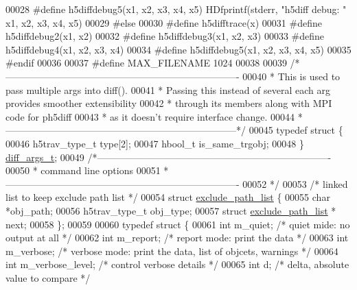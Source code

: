 \begin{DoxyCode}
00028 \textcolor{preprocessor}{#define h5diffdebug5(x1, x2, x3, x4, x5) HDfprintf(stderr, "h5diff debug: " x1, x2, x3, x4, x5)}
00029 \textcolor{preprocessor}{#else}
00030 \textcolor{preprocessor}{#define h5difftrace(x)}
00031 \textcolor{preprocessor}{#define h5diffdebug2(x1, x2)}
00032 \textcolor{preprocessor}{#define h5diffdebug3(x1, x2, x3)}
00033 \textcolor{preprocessor}{#define h5diffdebug4(x1, x2, x3, x4)}
00034 \textcolor{preprocessor}{#define h5diffdebug5(x1, x2, x3, x4, x5)}
00035 \textcolor{preprocessor}{#endif}
00036 
00037 \textcolor{preprocessor}{#define MAX\_FILENAME 1024}
00038 
00039 \textcolor{comment}{/*-------------------------------------------------------------------------}
00040 \textcolor{comment}{ * This is used to pass multiple args into diff().}
00041 \textcolor{comment}{ * Passing this instead of several each arg provides smoother extensibility }
00042 \textcolor{comment}{ * through its members along with MPI code for ph5diff}
00043 \textcolor{comment}{ * as it doesn't require interface change.}
00044 \textcolor{comment}{ *------------------------------------------------------------------------*/}
00045 \textcolor{keyword}{typedef} \textcolor{keyword}{struct }\{
00046     h5trav\_type\_t   type[2];
00047     hbool\_t is\_same\_trgobj;
00048 \} \hyperlink{structdiff__args__t}{diff\_args\_t};
00049 \textcolor{comment}{/*-------------------------------------------------------------------------}
00050 \textcolor{comment}{ * command line options}
00051 \textcolor{comment}{ *-------------------------------------------------------------------------}
00052 \textcolor{comment}{ */}
00053 \textcolor{comment}{/* linked list to keep exclude path list */}
00054 \textcolor{keyword}{struct }\hyperlink{structexclude__path__list}{exclude\_path\_list} \{
00055     \textcolor{keywordtype}{char}  *obj\_path;
00056     h5trav\_type\_t obj\_type;
00057     \textcolor{keyword}{struct }\hyperlink{structexclude__path__list}{exclude\_path\_list} * next;
00058 \};
00059 
00060 \textcolor{keyword}{typedef} \textcolor{keyword}{struct }\{
00061     \textcolor{keywordtype}{int}      m\_quiet;               \textcolor{comment}{/* quiet mide: no output at all */}
00062     \textcolor{keywordtype}{int}      m\_report;              \textcolor{comment}{/* report mode: print the data */}
00063     \textcolor{keywordtype}{int}      m\_verbose;             \textcolor{comment}{/* verbose mode: print the data, list of objcets, warnings */}
00064     \textcolor{keywordtype}{int}      m\_verbose\_level;       \textcolor{comment}{/* control verbose details */}
00065     \textcolor{keywordtype}{int}      d;                     \textcolor{comment}{/* delta, absolute value to compare */}

\end{DoxyCode}
